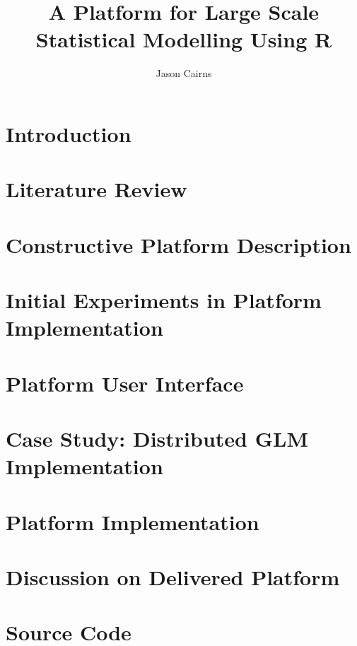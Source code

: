 \documentclass[11pt,a4paper,partial,examcopy]{aucklandthesis} %
\title{A Platform for Large Scale Statistical Modelling Using R}
\author{Jason Cairns}
\begin{document}


\chapter{Introduction}


\chapter{Literature Review}


\chapter{Constructive Platform Description}


\chapter{Initial Experiments in Platform Implementation}


\chapter{Platform User Interface}\label{sec:ui}


\chapter{Case Study: Distributed GLM Implementation}\label{sec:glm}


\chapter{Platform Implementation}


\chapter{Discussion on Delivered Platform}


\appendix
\chapter{Source Code}

\printbibliography
\end{document}
